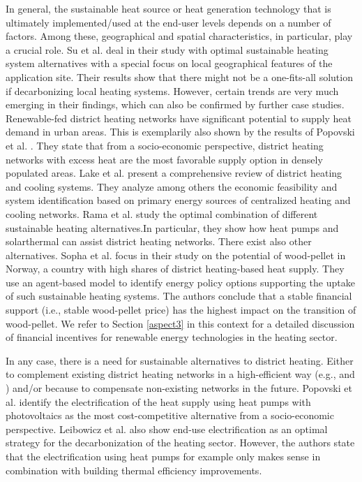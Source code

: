In general, the sustainable heat source or heat generation technology that is ultimately implemented/used at the end-user levels depends on a number of factors. Among these, geographical and spatial characteristics, in particular, play a crucial role. Su et al. \cite{su2018heating} deal in their study with optimal sustainable heating system alternatives with a special focus on local geographical features of the application site. Their results show that there might not be a one-fits-all solution if decarbonizing local heating systems. However, certain trends are very much emerging in their findings, which can also be confirmed by further case studies. Renewable-fed district heating networks have significant potential to supply heat demand in urban areas. This is exemplarily also shown by the results of Popovski et al. \cite{popovski2018technical}. They state that from a socio-economic perspective, district heating networks with excess heat are the most favorable supply option in densely populated areas. Lake et al. \cite{lake2017review} present a comprehensive review of district heating and cooling systems. They analyze among others the economic feasibility and system identification based on primary energy sources of centralized heating and cooling networks. Rama et al. \cite{rama2018introduction} study the optimal combination of different sustainable heating alternatives.In particular, they show how heat pumps and solarthermal can assist district heating networks. There exist also other alternatives. Sopha et al. \cite{sopha2011exploring} focus in their study on the potential of wood-pellet in Norway, a country with high shares of district heating-based heat supply. They use an agent-based model to identify energy policy options supporting the uptake of such sustainable heating systems. The authors conclude that a stable financial support (i.e., stable wood-pellet price) has the highest impact on the transition of wood-pellet. We refer to Section \ref{aspect3} in this context for a detailed discussion of financial incentives for renewable energy technologies in the heating sector.\vspace{0.5cm}

In any case, there is a need for sustainable alternatives to district heating. Either to complement existing district heating networks in a high-efficient way (e.g., \cite{rama2018introduction} and \cite{sopha2011exploring}) and/or because to compensate non-existing networks in the future. Popovski et al. \cite{popovski2018technical} identify the electrification of the heat supply using heat pumps with photovoltaics as the most cost-competitive alternative from a socio-economic perspective. Leibowicz et al. \cite{leibowicz2018optimal} also show end-use electrification as an optimal strategy for the decarbonization of the heating sector. However, the authors state that the electrification using heat pumps for example only makes sense in combination with building thermal efficiency improvements.\vspace{0.5cm}

